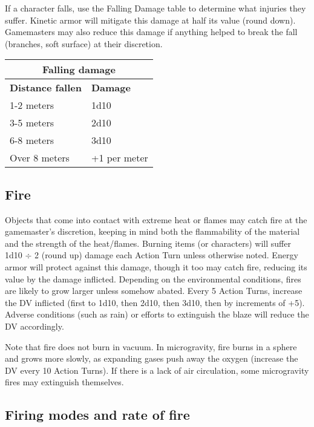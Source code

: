 If a character falls, use the Falling Damage table to determine what injuries they suffer. Kinetic armor will mitigate this damage at half its value (round down). Gamemasters may also reduce this damage if anything helped to break the fall (branches, soft surface) at their discretion.

\begin{table} \begin{tabular}{|l|l|}
\hline \multicolumn{2}{|c|}{\textbf{Falling damage}} \\
\hline \textbf{Distance fallen}	& \textbf{Damage} \\
\hline 1-2 meters				& 1d10 \\
\hline 3-5 meters				& 2d10 \\
\hline 6-8 meters				& 3d10 \\
\hline Over 8 meters			& +1 per meter \\
\hline
\end{tabular}
\label{table:falling-damage}
\end{table}


\subsection{Fire}
\label{sec:fire}

Objects that come into contact with extreme heat or flames may catch fire at the gamemaster’s discretion, keeping in mind both the flammability of the material and the strength of the heat/flames. Burning items (or characters) will suffer 1d10 $\div$ 2 (round up) damage each Action Turn unless otherwise noted. Energy armor will protect against this damage, though it too may catch fire, reducing its value by the damage inflicted. Depending on the environmental conditions, fires are likely to grow larger unless somehow abated. Every 5 Action Turns, increase the DV inflicted (first to 1d10, then 2d10, then 3d10, then by increments of +5). Adverse conditions (such as rain) or efforts to extinguish the blaze will reduce the DV accordingly.

Note that fire does not burn in vacuum. In microgravity, fire burns in a sphere and grows more slowly, as expanding gases push away the oxygen (increase the DV every 10 Action Turns). If there is a lack of air circulation, some microgravity fires may extinguish themselves.


\subsection{Firing modes and rate of fire}
\label{sec:firing-modes-rate}

